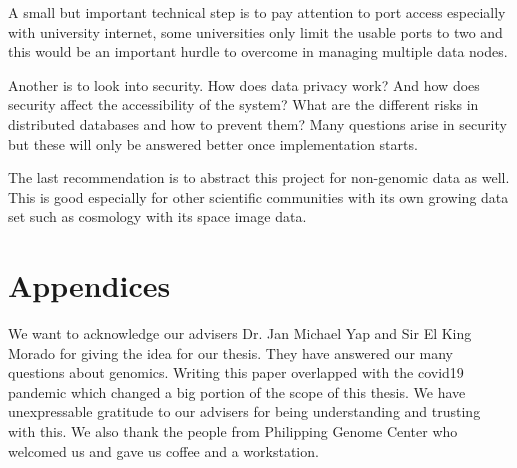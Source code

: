 \documentclass[acmsmall]{acmart}
\begin{document}
A small but important technical step is to pay attention to port access especially with university internet, some universities only limit the usable ports to two and this would be an important hurdle to overcome in managing multiple data nodes.

Another is to look into security. How does data privacy work? And how does security affect the accessibility of the system? What are the different risks in distributed databases and how to prevent them? Many questions arise in security but these will only be answered better once implementation starts.

The last recommendation is to abstract this project for non-genomic data as well. This is good especially for other scientific communities with its own growing data set such as cosmology with its space image data. 


\section{Appendices}

\begin{acks}

We want to acknowledge our advisers Dr. Jan Michael Yap and Sir El King Morado for giving the idea for our thesis. They have answered our many questions about genomics. Writing this paper overlapped with the covid19 pandemic which changed a big portion of the scope of this thesis. We have unexpressable gratitude to our advisers for being understanding and trusting with this. We also thank the people from Philipping Genome Center who welcomed us and gave us coffee and a workstation.
\end{acks}




\appendix
\end{document}
